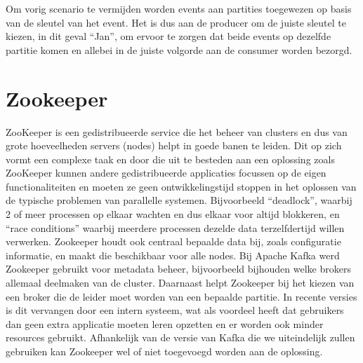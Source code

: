 Om vorig scenario te vermijden worden events aan partities toegewezen op basis van de sleutel van het event. Het is dus aan de producer om de juiste sleutel te kiezen, in dit geval ``Jan'', om ervoor te zorgen dat beide events op dezelfde partitie komen en allebei in de juiste volgorde aan de consumer worden bezorgd.
\newline
\newline


\section{Zookeeper}
ZooKeeper is een gedistribueerde service die het beheer van clusters en dus van grote hoeveelheden servers (nodes) helpt in goede banen te leiden. Dit op zich vormt een complexe taak en door die uit te besteden aan een oplossing zoals ZooKeeper kunnen andere gedistribueerde applicaties focussen op de eigen functionaliteiten en moeten ze geen ontwikkelingstijd stoppen in het oplossen van de typische problemen van parallelle systemen. Bijvoorbeeld ``deadlock'', waarbij 2 of meer processen op elkaar wachten en dus elkaar voor altijd blokkeren, en ``race conditions'' waarbij meerdere processen dezelde data terzelfdertijd willen verwerken. 
Zookeeper houdt ook centraal bepaalde data bij, zoals configuratie informatie, en maakt die beschikbaar voor alle nodes.\autocite{ASF2023}
\newline
\newline 
Bij Apache Kafka werd Zookeeper gebruikt voor metadata beheer, bijvoorbeeld bijhouden welke brokers allemaal deelmaken van de cluster. Daarnaast helpt Zookeeper bij het kiezen van een broker die de leider moet worden van een bepaalde partitie. In recente versies is dit vervangen door een intern systeem, wat als voordeel heeft dat gebruikers dan geen extra applicatie moeten leren opzetten en er worden ook minder resources gebruikt.
\autocite{Conduktor2023}
\newline
\newline
Afhankelijk van de versie van Kafka die we uiteindelijk zullen gebruiken kan Zookeeper wel of niet toegevoegd worden aan de oplossing.
\newline
\newline

